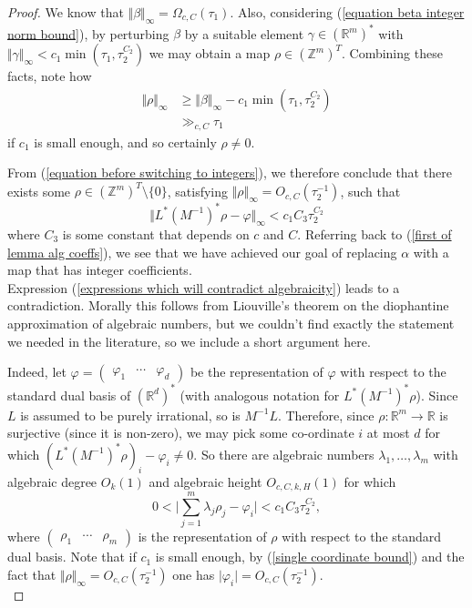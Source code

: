 \documentclass[12pt,a4paper,twoside,reqno]{amsart}
\numberwithin{equation}{section}
\begin{document}
\begin{proof}
We know that $\Vert \beta \Vert_\infty = \Omega_{c,C}( \tau_1)$. Also, considering (\ref{equation beta integer norm bound}), by perturbing $\beta$ by a suitable element $\gamma \in (\mathbb{R}^m)^*$ with $\Vert \gamma\Vert_\infty < c_1 \min(\tau_1,\tau_2^{C_2})$ we may obtain a map $\rho\in(\mathbb{Z}^{m})^T$. Combining these facts, note how  
\begin{align*}
\Vert \rho\Vert_\infty &\geqslant \Vert \beta \Vert_\infty -  c_1 \min(\tau_1,\tau_2^{C_2})\\
&\gg_{c,C} \tau_1
\end{align*} if $c_1$ is small enough, and so certainly $\rho \neq 0$.

From (\ref{equation before switching to integers}), we therefore conclude that there exists some $\rho \in (\mathbb{Z}^m)^T\setminus \{0\}$, satisfying $\Vert \rho\Vert_\infty = O_{c,C}(\tau_2^{-1})$, such that \begin{equation}
\label{expressions which will contradict algebraicity}
 \Vert L^* (M^{-1})^*\rho - \varphi \Vert_\infty < c_1 C_3\tau_2^{C_2}
\end{equation} where $C_3$ is some constant that depends on $c$ and $C$. Referring back to (\ref{first of lemma alg coeffs}), we see that we have achieved our goal of replacing $\alpha$ with a map that has integer coefficients.\\

Expression (\ref{expressions which will contradict algebraicity}) leads to a contradiction. Morally this follows from Liouville's theorem on the diophantine approximation of algebraic numbers, but we couldn't find exactly the statement we needed in the literature, so we include a short argument here. 



Indeed, let $\varphi = (\begin{matrix} \varphi_1 & \cdots & \varphi_d\end{matrix})$ be the representation of $\varphi$ with respect to the standard dual basis of $(\mathbb{R}^d)^*$ (with analogous notation for $L^* (M^{-1})^* \rho$). Since $L$ is assumed to be purely irrational, so is $M^{-1}L$. Therefore, since $\rho:\mathbb{R}^m \longrightarrow \mathbb{R}$ is surjective (since it is non-zero), we may pick some co-ordinate $i$ at most $d$ for which $(L^* (M^{-1})^* \rho)_i - \varphi_i \neq 0$. So there are algebraic numbers $\lambda_1,\dots,\lambda_{m}$ with algebraic degree $O_{k}(1)$ and algebraic height $O_{c,C,k,H}(1)$ for which 
\begin{equation}
\label{single coordinate bound}
0<\vert \sum\limits_{j=1}^{m}\lambda_j\rho_j - \varphi_i\vert< c_1C_3 \tau_2^{C_2},
\end{equation} where $(\begin{matrix} \rho_1 & \cdots & \rho_m\end{matrix})$ is the representation of $\rho$ with respect to the standard dual basis. Note that if $c_1$ is small enough, by (\ref{single coordinate bound}) and the fact that $\Vert\rho\Vert_\infty = O_{c,C} (\tau_2^{-1})$ one has $\vert \varphi_i\vert  = O_{c,C} (\tau_2^{-1})$. \\


\end{proof}
\end{document}
